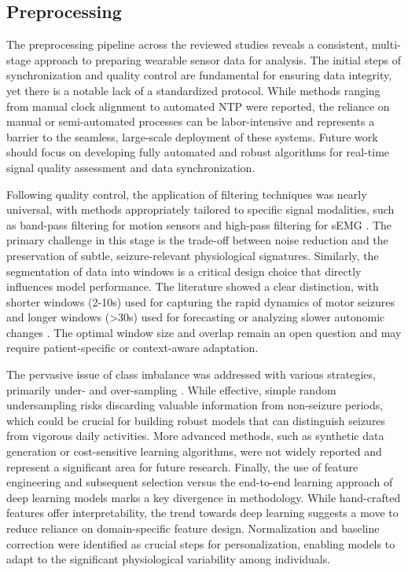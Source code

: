 \subsection{Preprocessing}
The preprocessing pipeline across the reviewed studies reveals a consistent, multi-stage approach to preparing wearable sensor data for analysis. The initial steps of synchronization and quality control are fundamental for ensuring data integrity, yet there is a notable lack of a standardized protocol. While methods ranging from manual clock alignment \cite{Yu2023-ss} to automated NTP \cite{Vakilna2024-hk} were reported, the reliance on manual or semi-automated processes can be labor-intensive and represents a barrier to the seamless, large-scale deployment of these systems. Future work should focus on developing fully automated and robust algorithms for real-time signal quality assessment and data synchronization.

Following quality control, the application of filtering techniques was nearly universal, with methods appropriately tailored to specific signal modalities, such as band-pass filtering for motion sensors \cite{Wu2024-yl, De_Cooman2018-pq} and high-pass filtering for sEMG \cite{Milosevic2016-ee}. The primary challenge in this stage is the trade-off between noise reduction and the preservation of subtle, seizure-relevant physiological signatures. Similarly, the segmentation of data into windows is a critical design choice that directly influences model performance. The literature showed a clear distinction, with shorter windows (2-10s) used for capturing the rapid dynamics of motor seizures \cite{Milosevic2016-ee, Larsen2024-vn} and longer windows (>30s) used for forecasting or analyzing slower autonomic changes \cite{Meisel2020-ii, Jiang2022-zu}. The optimal window size and overlap remain an open question and may require patient-specific or context-aware adaptation.

The pervasive issue of class imbalance was addressed with various strategies, primarily under- and over-sampling \cite{Yu2023-ss, Tang2021-td, Larsen2024-vn}. While effective, simple random undersampling risks discarding valuable information from non-seizure periods, which could be crucial for building robust models that can distinguish seizures from vigorous daily activities. More advanced methods, such as synthetic data generation or cost-sensitive learning algorithms, were not widely reported and represent a significant area for future research. Finally, the use of feature engineering and subsequent selection \cite{Ge2023-ab, Xu2022-tx} versus the end-to-end learning approach of deep learning models marks a key divergence in methodology. While hand-crafted features offer interpretability, the trend towards deep learning suggests a move to reduce reliance on domain-specific feature design. Normalization and baseline correction \cite{Jiang2022-zu, Nasseri2021-xn} were identified as crucial steps for personalization, enabling models to adapt to the significant physiological variability among individuals.


